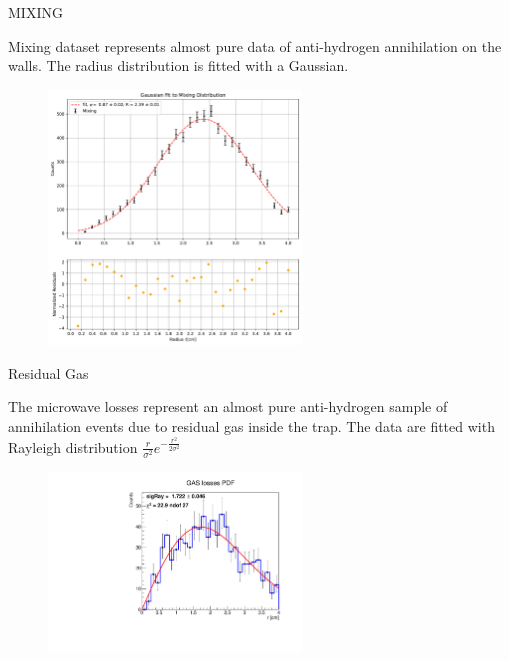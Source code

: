 \documentclass[9pt]{beamer}
\begin{document}
\begin{frame}{MIXING}

Mixing dataset represents almost pure data of anti-hydrogen annihilation on the walls. The radius distribution is fitted with a Gaussian.

\begin{figure}
\vspace{-2pt}
\includegraphics[width = 0.6\textwidth]{./SingleModel/GaussianFitMixing.pdf}
\end{figure}

\end{frame}

\begin{frame}{Residual Gas}

The microwave losses represent an almost pure anti-hydrogen sample of annihilation events due to residual gas inside the trap. The data are fitted with Rayleigh distribution $\frac{r}{\sigma^{2}} e^{-\frac{r^{2}}{2 \sigma^{2}}}$

\begin{figure}
\includegraphics[width = 0.60\textwidth]{./SingleModel/FitToUW.pdf}
\end{figure}

\end{frame}
\end{document}
